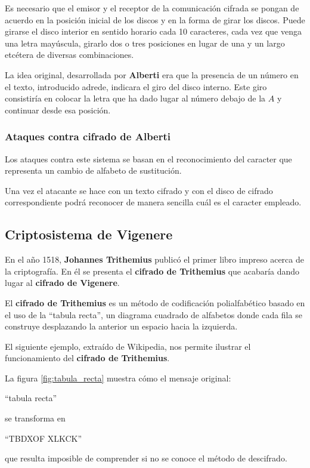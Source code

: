 \documentclass[nochap]{apuntesURJC}
\begin{document}
Es necesario que el emisor y el receptor de la comunicación cifrada se pongan de acuerdo en la posición inicial de los discos y en la forma de girar los discos. Puede girarse el disco interior en sentido horario cada 10 caracteres, cada vez que venga una letra mayúscula, girarlo dos o tres posiciones en lugar de una y un largo etcétera de diversas combinaciones.

La idea original, desarrollada por \textbf{Alberti} era que la presencia de un número en el texto, introducido adrede, indicara el giro del disco interno. Este giro consistiría en colocar la letra que ha dado lugar al número debajo de la $A$ y continuar desde esa posición.

\subsubsection{Ataques contra cifrado de Alberti}

Los ataques contra este sistema se basan en el reconocimiento del caracter que representa un cambio de alfabeto de sustitución.

Una vez el atacante se hace con un texto cifrado y con el disco de cifrado correspondiente podrá reconocer de manera sencilla cuál es el caracter empleado.

\subsection{Criptosistema de Vigenere}
En el año 1518, \textbf{Johannes Trithemius} publicó el primer libro impreso acerca de la criptografía. En él se presenta el \textbf{cifrado de Trithemius} que acabaría dando lugar al \textbf{cifrado de Vigenere}.

El \textbf{cifrado de Trithemius} es un método de codificación polialfabético basado en el uso de la ``tabula recta'', un diagrama cuadrado de alfabetos donde cada fila se construye desplazando la anterior un espacio hacia la izquierda.

El siguiente ejemplo, extraído de Wikipedia, nos permite ilustrar el funcionamiento del \textbf{cifrado de Trithemius}.

La figura \ref{fig:tabula_recta} muestra cómo el mensaje original:
\begin{center}
``tabula recta''
\end{center}
se transforma en
\begin{center}
``TBDXOF XLKCK''
\end{center}
que resulta imposible de comprender si no se conoce el método de descifrado.
\end{document}

